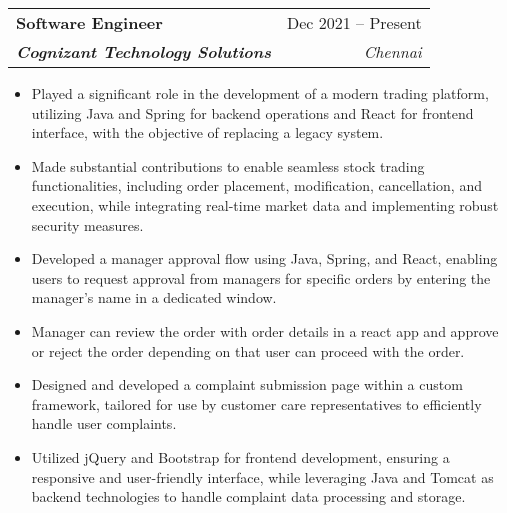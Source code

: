 \documentclass[letterpaper,11pt]{article}
\makeatletter
\newcommand{\resumeItem}[1]{
  \item\small{
    {#1 \vspace{-2pt}}
  }
}
\newcommand{\resumeSubheading}[4]{
  \vspace{-2pt}\item
    \begin{tabular*}{0.97\textwidth}[t]{l@{\extracolsep{\fill}}r}
      \textbf{#1} & #2 \\
      \textit{\small#3} & \textit{\small #4} \\
    \end{tabular*}\vspace{-7pt}
}
\newcommand{\resumeSubSubheading}[2]{
    \item
    \begin{tabular*}{0.97\textwidth}{l@{\extracolsep{\fill}}r}
      \textit{\small#1} & \textit{\small #2} \\
    \end{tabular*}\vspace{-7pt}
}
\newcommand{\resumeSubHeadingListEnd}{\end{itemize}}
\newcommand{\resumeItemListStart}{\begin{itemize}}
\newcommand{\resumeItemListEnd}{\end{itemize}\vspace{-5pt}}
\makeatother
\begin{document}
    \resumeSubheading
      {Software Engineer}{Dec 2021 -- Present}
      {\textbf{\textit{Cognizant Technology Solutions}}}{Chennai}
      \resumeItemListStart
        \resumeItem{Played a significant role in the development of a modern trading platform, utilizing Java and Spring for backend operations and React for frontend interface, with the objective of replacing a legacy system.}
        \resumeItem{Made substantial contributions to enable seamless stock trading functionalities, including order placement, modification, cancellation, and execution, while integrating real-time market data and implementing robust security measures.}
        \resumeItem{ Developed a manager approval flow using Java, Spring, and React, enabling users to request approval from managers for specific orders by entering the manager's name in a dedicated window. }
        \resumeItem{ Manager can review the order with order details in a react app and approve or reject the order depending on that user can proceed with the order. }
        \resumeItem{Designed and developed a complaint submission page within a custom framework, tailored for use by customer care representatives to efficiently handle user complaints.}
        \resumeItem{Utilized jQuery and Bootstrap for frontend development, ensuring a responsive and user-friendly interface, while leveraging Java and Tomcat as backend technologies to handle complaint data processing and storage.}
      \resumeItemListEnd


      


\end{document}
